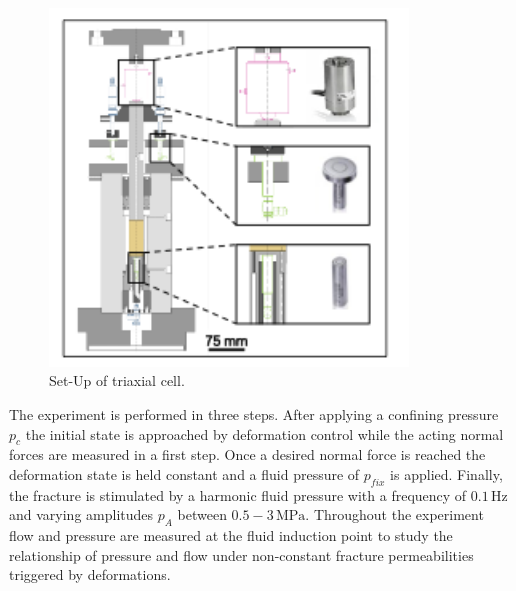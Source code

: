 \begin{figure}[!ht]
\begin{center}
\includegraphics[width=0.85\textwidth]{./figures/exp_cyclic_pressure_triax.png}
\end{center}
\caption{Set-Up of triaxial cell.}
\label{fig:exp_cyclic_pressure_triax}
\end{figure}

The experiment is performed in three steps. After applying a confining pressure $p_{c}$ the initial state is approached by deformation control while the acting normal forces are measured in a first step. Once a desired normal force is reached the deformation state is held constant and a fluid pressure of $p_{fix}$ is applied. Finally, the fracture is stimulated by a harmonic fluid pressure with a frequency of $0.1 \, \text{Hz}$ and varying amplitudes $p_A$ between $0.5-3 \, \text{MPa}$. Throughout the experiment flow and pressure are measured at the fluid induction point to study the relationship of pressure and flow under non-constant fracture permeabilities triggered by deformations.
